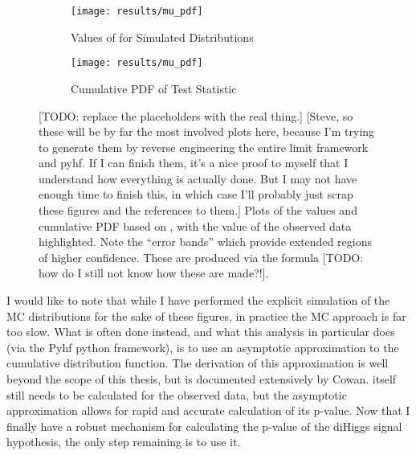     \begin{figure}
        \centering
        \begin{subfigure}{0.48\textwidth} 
            \texttt{[image: results/mu\_pdf]}
            \caption{Values of \qtil for Simulated Distributions}
            \label{fig:qtil:pdf}
        \end{subfigure}
        \begin{subfigure}{0.48\textwidth}
            \texttt{[image: results/mu\_pdf]}
            \caption{Cumulative PDF of \qtil Test Statistic}
            \label{fig:qtil:Cpdf}
        \end{subfigure}
        \caption{
            [TODO: replace the placeholders with the real thing.]
            [Steve, so these will be by far the most involved plots here,
                because I'm trying to generate them by reverse engineering the entire limit framework and pyhf.
            If I can finish them, it's a nice proof to myself that I understand how everything is actually done.
            But I may not have enough time to finish this,
                in which case I'll probably just scrap these figures and the references to them.]
            Plots of the values and cumulative PDF based on \qtil,
                with the \qtil value of the observed data highlighted.
            Note the ``error bands'' which provide extended regions of higher confidence.
            These are produced via the formula [TODO: how do I still not know how these are made?!].
        }
    \end{figure}

    I would like to note that while I have performed the explicit simulation of the MC distributions for the sake of these figures,
        in practice the MC approach is far too slow.
    What is often done instead, and what this analysis in particular does (via the Pyhf python framework),
        is to use an asymptotic approximation to the \qtil cumulative distribution function.
    The derivation of this approximation is well beyond the scope of this thesis,
        but is documented extensively by Cowan\cite{asymptotic_formulae_for_likelihood}.
    \qtil itself still needs to be calculated for the observed data,
        but the asymptotic approximation allows for rapid and accurate calculation of its p-value.
    Now that I finally have a robust mechanism for calculating the p-value of the diHiggs signal hypothesis,
        the only step remaining is to use it.

